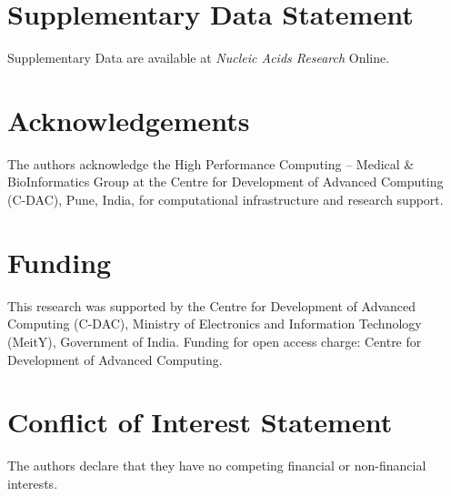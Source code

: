 \documentclass[twocolumn]{article}
\begin{document}
\section*{Supplementary Data Statement}
Supplementary Data are available at \textit{Nucleic Acids Research} Online.

\section*{Acknowledgements}
The authors acknowledge the High Performance Computing -- Medical \& BioInformatics Group at the Centre for Development of Advanced Computing (C-DAC), Pune, India, for computational infrastructure and research support.

\section*{Funding}
This research was supported by the Centre for Development of Advanced Computing (C-DAC), Ministry of Electronics and Information Technology (MeitY), Government of India. Funding for open access charge: Centre for Development of Advanced Computing.

\section*{Conflict of Interest Statement}
The authors declare that they have no competing financial or non-financial interests.
\end{document}
